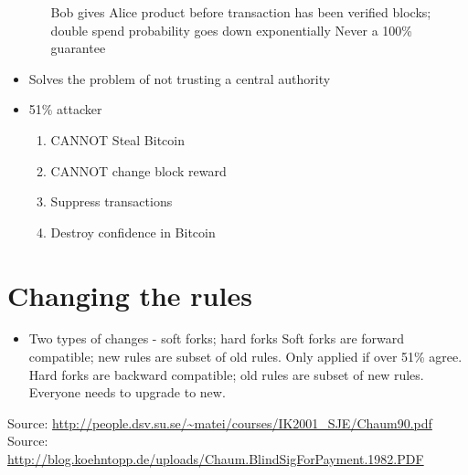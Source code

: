 \documentclass{article}
\begin{document}
\begin{itemize}
\begin{itemize}
        \subitem Bob gives Alice product before transaction has been verified
         blocks; double spend probability goes down exponentially
        \subitem Never a 100\% guarantee
    \end{itemize}
  \item Solves the problem of not trusting a central authority 
  \item 51\% attacker
    \begin{enumerate}
      \item CANNOT Steal Bitcoin
      \item CANNOT change block reward
      \item Suppress transactions
      \item Destroy confidence in Bitcoin
    \end{enumerate}
\end{itemize}


\section*{Changing the rules}
\begin{itemize}
  \item Two types of changes - soft forks; hard forks
    \subitem Soft forks are forward compatible; new rules are subset of old rules. Only applied if over 51\% agree.
    \subitem Hard forks are backward compatible; old rules are subset of new rules. Everyone needs to upgrade to new.
\end{itemize}



Source: \url{http://people.dsv.su.se/~matei/courses/IK2001_SJE/Chaum90.pdf}\\
Source: \url{http://blog.koehntopp.de/uploads/Chaum.BlindSigForPayment.1982.PDF}
\end{document}
